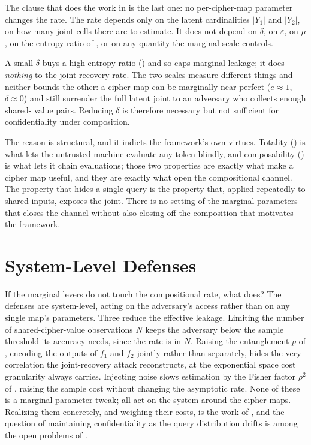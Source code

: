 The clause that does the work in  is the last one:
no per-cipher-map parameter changes the rate. The rate depends only on the
latent cardinalities $\lvert Y_1\rvert$ and $\lvert Y_2\rvert$, on how many
joint cells there are to estimate. It does not depend on $\delta$, on
$\varepsilon$, on $\mu$, on the entropy ratio of , or
on any quantity the marginal scale controls.

\begin{remark}
\label{rem:irreducibility}
A small $\delta$ buys a high entropy ratio () and so caps
marginal leakage; it does \emph{nothing} to the joint-recovery rate. The two
scales measure different things and neither bounds the other: a cipher map
can be marginally near-perfect ($e \approx 1$, $\delta \approx 0$) and still
surrender the full latent joint to an adversary who collects enough shared-%
value pairs. Reducing $\delta$ is therefore necessary but not sufficient for
confidentiality under composition.
\end{remark}

The reason is structural, and it indicts the framework's own virtues.
Totality () is what lets the untrusted machine evaluate
any token blindly, and composability () is what lets it
chain evaluations; those two properties are exactly what make a cipher map
useful, and they are exactly what open the compositional channel. The
property that hides a single query is the property that, applied repeatedly
to shared inputs, exposes the joint. There is no setting of the marginal
parameters that closes the channel without also closing off the composition
that motivates the framework.

\section{System-Level Defenses}
\label{sec:defenses}

If the marginal levers do not touch the compositional rate, what does? The
defenses are system-level, acting on the adversary's access rather than on
any single map's parameters. Three reduce the effective leakage. Limiting
the number of shared-cipher-value observations $N$ keeps the adversary below
the sample threshold its accuracy needs, since the rate is in $N$. Raising
the entanglement $p$ of , encoding the outputs of
$f_1$ and $f_2$ jointly rather than separately, hides the very correlation
the joint-recovery attack reconstructs, at the exponential space cost
granularity always carries. Injecting noise slows estimation by the Fisher
factor $\rho^2$ of , raising the sample cost without
changing the asymptotic rate. None of these is a marginal-parameter tweak;
all act on the system around the cipher maps. Realizing them concretely,
and weighing their costs, is the work of , and the
question of maintaining confidentiality as the query distribution drifts is
among the open problems of .


